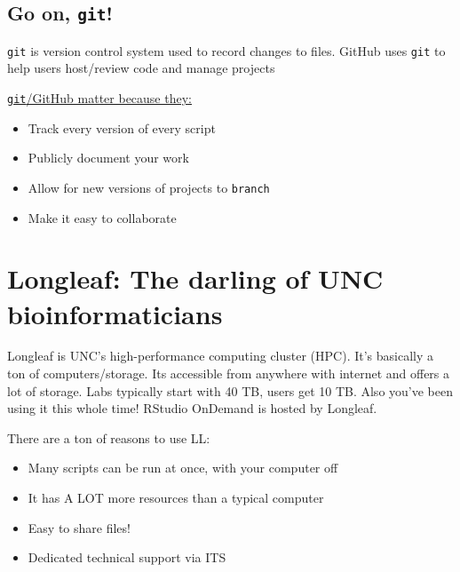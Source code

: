 \documentclass[
  letterpaper,
  DIV=11,
  numbers=noendperiod]{scrreprt}
\begin{document}
\hypertarget{go-on-git}{%
\subsection{\texorpdfstring{Go on,
\texttt{git}!}{Go on, git!}}\label{go-on-git}}

\texttt{git} is version control system used to record changes to files.
{GitHub} uses \texttt{git} to help users host/review code and manage
projects

\uline{\texttt{git}/GitHub matter because they:}

\begin{itemize}
\item
  Track every version of every script
\item
  Publicly document your work
\item
  Allow for new versions of projects to \texttt{branch}
\item
  Make it easy to collaborate
\end{itemize}

\hypertarget{longleaf-the-darling-of-unc-bioinformaticians}{%
\section{Longleaf: The darling of UNC
bioinformaticians}\label{longleaf-the-darling-of-unc-bioinformaticians}}

Longleaf is UNC's high-performance computing cluster (HPC). It's
basically a ton of computers/storage. Its accessible from anywhere with
internet and offers a lot of storage. Labs typically start with 40 TB,
users get 10 TB. Also you've been using it this whole time! RStudio
OnDemand is hosted by Longleaf.

\begin{tcolorbox}[enhanced jigsaw, left=2mm, colframe=quarto-callout-tip-color-frame, leftrule=.75mm, opacitybacktitle=0.6, toptitle=1mm, title=\textcolor{quarto-callout-tip-color}{\faLightbulb}\hspace{0.5em}{Tip}, opacityback=0, coltitle=black, colbacktitle=quarto-callout-tip-color!10!white, breakable, colback=white, titlerule=0mm, bottomrule=.15mm, arc=.35mm, bottomtitle=1mm, rightrule=.15mm, toprule=.15mm]

There are a ton of reasons to use LL:

\begin{itemize}
\item
  Many scripts can be run at once, with your computer off
\item
  It has A LOT more resources than a typical computer
\item
  Easy to share files!
\item
  Dedicated technical support via ITS
\end{itemize}

\end{tcolorbox}
\end{document}
